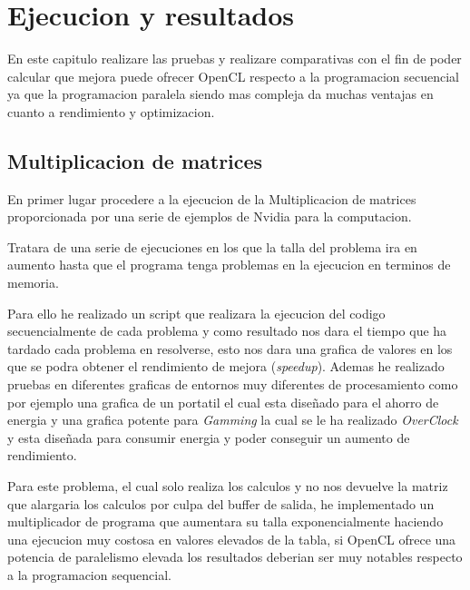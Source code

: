 \chapter{Ejecucion y resultados}

En este capitulo realizare las pruebas y realizare comparativas con el fin de poder calcular que mejora puede ofrecer OpenCL respecto a la programacion secuencial ya que la programacion paralela siendo mas compleja da muchas ventajas en cuanto a rendimiento y optimizacion.

\section{Multiplicacion de matrices}

En primer lugar procedere a la ejecucion de la Multiplicacion de matrices proporcionada por una serie de ejemplos de Nvidia para la computacion.

Tratara de una serie de ejecuciones en los que la talla del problema ira en aumento hasta que el programa tenga problemas en la ejecucion en terminos de memoria.

Para ello he realizado un script que realizara la ejecucion del codigo secuencialmente de cada problema y como resultado nos dara el tiempo que ha tardado cada problema en resolverse, esto nos dara una grafica de valores en los que se podra obtener el rendimiento de mejora (\textit{speedup}).
Ademas he realizado pruebas en diferentes graficas de entornos muy diferentes de procesamiento como por ejemplo una grafica de un portatil el cual esta diseñado para el ahorro de energia y una grafica potente para \textit{Gamming} la cual se le ha realizado \textit{OverClock} y esta diseñada para consumir energia y poder conseguir un aumento de rendimiento.

Para este problema, el cual solo realiza los calculos y no nos devuelve la matriz que alargaria los calculos por culpa del buffer de salida,  he implementado un multiplicador de programa que aumentara su talla exponencialmente haciendo una ejecucion muy costosa en valores elevados de la tabla, si OpenCL ofrece una potencia de paralelismo elevada los resultados deberian ser muy notables respecto a la programacion sequencial.






	


